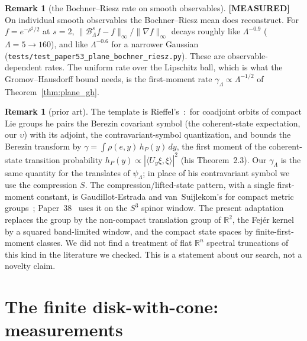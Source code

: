 \documentclass[11pt,a4paper]{article}
\theoremstyle{plain}
\theoremstyle{definition}
\newtheorem{remark}[theorem]{Remark}
\newcommand{\Berez}{\mathcal{B}}
\newcommand{\supnorm}[1]{\lVert #1 \rVert_{\infty}}
\newcommand{\R}{\mathbb{R}}
\begin{document}
\begin{remark}[the Bochner--Riesz rate on smooth observables]
\label{rem:br_rate}
\textbf{[MEASURED]} On individual smooth observables the Bochner--Riesz
mean does reconstruct. For $f=e^{-\rho^{2}/2}$ at $s=2$,
$\supnorm{\Berez_{\Lambda}^{s}f-f}/\supnorm{\nabla f}$ decays roughly like
$\Lambda^{-0.9}$ ($\Lambda=5\to160$), and like $\Lambda^{-0.6}$ for a
narrower Gaussian (\texttt{tests/test\_paper53\_plane\_bochner\_riesz.py}).
These are observable-dependent rates. The uniform rate over the
Lipschitz ball, which is what the Gromov--Hausdorff bound needs, is the
first-moment rate $\gamma_{\Lambda}\propto\Lambda^{-1/2}$ of
Theorem~\ref{thm:plane_gh}.
\end{remark}

\begin{remark}[prior art]\label{rem:prior_art}
The template is Rieffel's~\cite{rieffel2004}:\ for coadjoint orbits of
compact Lie groups he pairs the Berezin covariant symbol (the
coherent-state expectation, our $\upsilon$) with its adjoint, the
contravariant-symbol quantization, and bounds the Berezin transform by
$\gamma=\int\rho(e,y)\,h_{P}(y)\,dy$, the first moment of the
coherent-state transition probability $h_{P}(y)\propto|\langle
U_{y}\xi,\xi\rangle|^{2}$ (his Theorem~2.3). Our $\gamma_{\Lambda}$ is the
same quantity for the translates of $\psi_{\Lambda}$; in place of his
contravariant symbol we use the compression $S$.
The compression/lifted-state pattern, with a single first-moment
constant, is Gaudillot-Estrada and van~Suijlekom's for compact metric
groups~\cite{gaudillot_vs2025}; Paper~38~\cite{paper38} uses it on the
$S^{3}$ spinor window. The present adaptation replaces the group by the
non-compact translation group of $\R^{2}$, the Fej\'er kernel by a
squared band-limited window, and the compact state spaces by
finite-first-moment classes. We did not find a treatment of flat
$\R^{n}$ spectral truncations of this kind in the literature we checked.
This is a statement about our search, not a novelty claim.
\end{remark}

\section{The finite disk-with-cone: measurements}
\label{sec:disk}
\end{document}

